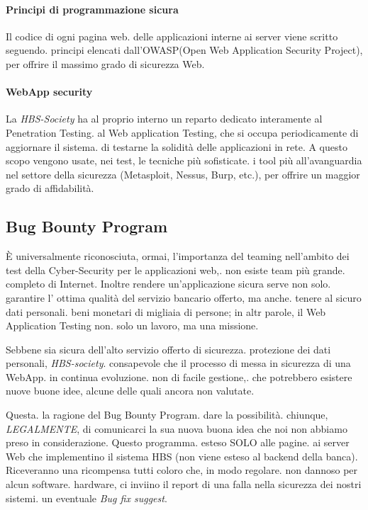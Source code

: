 	\paragraph{Principi di programmazione sicura}
Il codice di ogni pagina web. delle applicazioni interne ai server viene scritto seguendo. principi elencati dall'OWASP(Open Web Application Security Project), per offrire il massimo grado di sicurezza Web.
	\paragraph{WebApp security}
La \emph{HBS-Society} ha al proprio interno un reparto dedicato interamente al Penetration Testing. al Web application Testing, che si occupa periodicamente di aggiornare il sistema. di testarne la solidità delle applicazioni in rete.
A questo scopo vengono usate, nei test, le tecniche più sofisticate. i tool più all'avanguardia nel settore della sicurezza (Metasploit, Nessus, Burp, etc.), per offrire un maggior grado di affidabilità.





\subsection{Bug Bounty Program}
\`E universalmente riconosciuta, ormai, l'importanza del teaming nell'ambito dei test della Cyber-Security per le applicazioni web,. non esiste team più grande. completo di Internet. Inoltre rendere un'applicazione sicura  serve non solo.  garantire l' ottima qualità del servizio bancario offerto, ma anche. tenere al sicuro dati personali. beni monetari di migliaia di persone; in altr parole, il Web Application Testing non. solo un lavoro, ma una missione.

Sebbene sia sicura dell'alto servizio offerto di sicurezza. protezione dei dati personali, \emph{HBS-society}. consapevole che il processo di messa in sicurezza di una WebApp. in continua evoluzione. non di facile gestione,. che potrebbero esistere nuove buone idee, alcune delle quali ancora non valutate.

Questa. la ragione del Bug Bounty Program. dare la possibilità. chiunque, \emph{LEGALMENTE}, di comunicarci la sua nuova buona idea che noi non abbiamo preso in considerazione. Questo programma. esteso SOLO alle pagine. ai server Web che implementino il sistema HBS (non viene esteso al backend della banca). Riceveranno una ricompensa tutti coloro che, in modo regolare. non dannoso per alcun software. hardware, ci inviino il report di una falla nella sicurezza dei nostri sistemi. un eventuale \emph{Bug fix suggest}.
